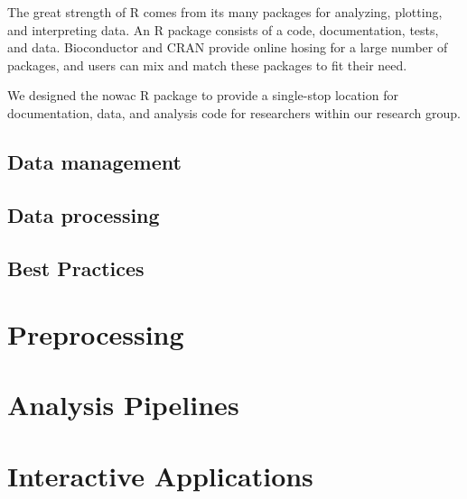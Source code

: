 The great strength of R comes from its many packages for analyzing, plotting,
and interpreting data. An R package consists of a code, documentation, tests,
and data. Bioconductor and CRAN provide online hosing for a large number of
packages, and users can mix and match these packages to fit their need. 

We designed the \gls{nowac} R package to provide a single-stop location for
documentation, data, and analysis code for researchers within our research
group. 

\subsection{Data management} 

\subsection{Data processing} 

\subsection{Best Practices} 



\section{Preprocessing} 

\section{Analysis Pipelines}

\section{Interactive Applications} 
